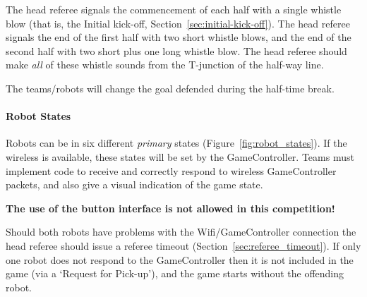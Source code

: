 The head referee signals the commencement of each half with a single whistle blow (that is, the Initial kick-off, \cf Section~\ref{sec:initial-kick-off}).
The head referee signals the end of the first half with two short whistle blows, and the end of the second half with two short plus one long whistle blow.
The head referee should make \textit{all} of these whistle sounds from the T-junction of the half-way line.

The teams/robots will change the goal defended during the half-time break.

\paragraph{Robot States}
\label{sec:robot_states}

Robots can be in six different \emph{primary} states (\cf Figure~\ref{fig:robot_states}). If the wireless is available, these states will be set by the GameController. Teams must implement code to receive and correctly respond to wireless GameController packets, and also give a visual indication of the game state.

\textbf{The use of the button interface is not allowed in this competition!} 

Should both robots have problems with the Wifi/GameController connection the head referee should issue a referee timeout (\cf Section~\ref{sec:referee_timeout}).
If only one robot does not respond to the GameController then it is not included in the game (via a `Request for Pick-up'), and the game starts without the offending robot.

